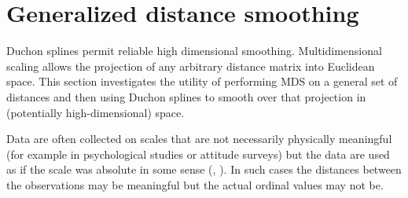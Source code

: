 \section{Generalized distance smoothing}
\label{gds-gds-examples}

Duchon splines permit reliable high dimensional smoothing. Multidimensional scaling allows the projection of any arbitrary distance matrix into Euclidean space. This section investigates the utility of performing MDS on a general set of distances and then using Duchon splines to smooth over that projection in (potentially high-dimensional) space.

Data are often collected on scales that are not necessarily physically meaningful (for example in psychological studies or attitude surveys) but the data are used as if the scale was absolute in some sense (\cite{cox2007}, \cite{torgerson}). In such cases the distances between the observations may be meaningful but the actual ordinal values may not be.

